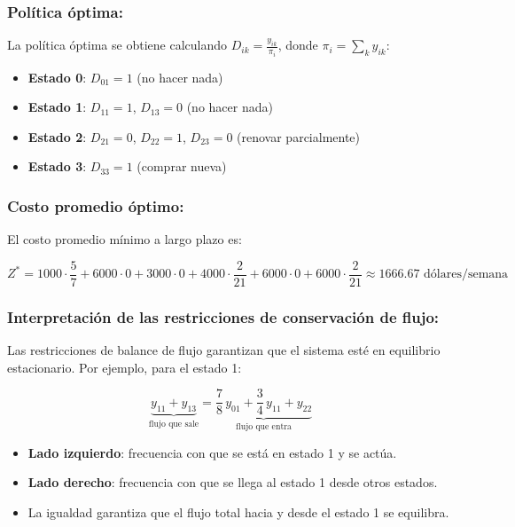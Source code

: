 \documentclass[a4paper,11pt]{article}
\begin{document}
\subsubsection{Política óptima:}

La política óptima se obtiene calculando $D_{ik} = \frac{y_{ik}}{\pi_i}$, donde $\pi_i = \sum_k y_{ik}$:

\begin{itemize}
    \item \textbf{Estado 0}: $D_{01} = 1$ (no hacer nada)
    \item \textbf{Estado 1}: $D_{11} = 1$, $D_{13} = 0$ (no hacer nada)
    \item \textbf{Estado 2}: $D_{21} = 0$, $D_{22} = 1$, $D_{23} = 0$ (renovar parcialmente)
    \item \textbf{Estado 3}: $D_{33} = 1$ (comprar nueva)
\end{itemize}

\subsubsection{Costo promedio óptimo:}

El costo promedio mínimo a largo plazo es:

\[
Z^* = 1000 \cdot \frac{5}{7} + 6000 \cdot 0 + 3000 \cdot 0 + 4000 \cdot \frac{2}{21} + 6000 \cdot 0 + 6000 \cdot \frac{2}{21} \approx 1666.67 \text{ dólares/semana}
\]

\subsubsection{Interpretación de las restricciones de conservación de flujo:}

Las restricciones de balance de flujo garantizan que el sistema esté en equilibrio estacionario. Por ejemplo, para el estado 1:

\[
\underbrace{y_{11} + y_{13}}_{\text{flujo que sale}} = \underbrace{\frac{7}{8}\,y_{01} + \frac{3}{4}\,y_{11} + y_{22}}_{\text{flujo que entra}}
\]

\begin{itemize}
    \item \textbf{Lado izquierdo}: frecuencia con que se está en estado 1 y se actúa.
    \item \textbf{Lado derecho}: frecuencia con que se llega al estado 1 desde otros estados.
    \item La igualdad garantiza que el flujo total hacia y desde el estado 1 se equilibra.
\end{itemize}
\end{document}
